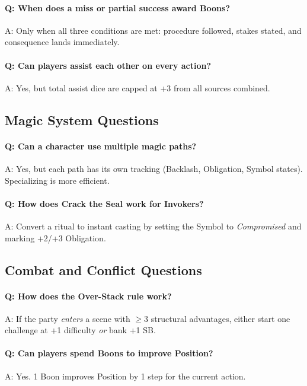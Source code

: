 \paragraph{Q: When does a miss or partial success award Boons?}
A: Only when all three conditions are met: procedure followed, stakes stated, and consequence lands immediately.

\paragraph{Q: Can players assist each other on every action?}
A: Yes, but total assist dice are capped at +3 from all sources combined.

\subsection{Magic System Questions}\label{subsec:magic_questions}
\paragraph{Q: Can a character use multiple magic paths?}
A: Yes, but each path has its own tracking (Backlash, Obligation, Symbol states). Specializing is more efficient.

\paragraph{Q: How does Crack the Seal work for Invokers?}
A: Convert a ritual to instant casting by setting the Symbol to \emph{Compromised} and marking +2/+3 Obligation.

\subsection{Combat and Conflict Questions}\label{subsec:combat_questions}
\paragraph{Q: How does the Over-Stack rule work?}
A: If the party \emph{enters} a scene with $\geq 3$ structural advantages, either start one challenge at +1 difficulty \emph{or} bank +1 SB.

\paragraph{Q: Can players spend Boons to improve Position?}
A: Yes. 1 Boon improves Position by 1 step for the current action.

